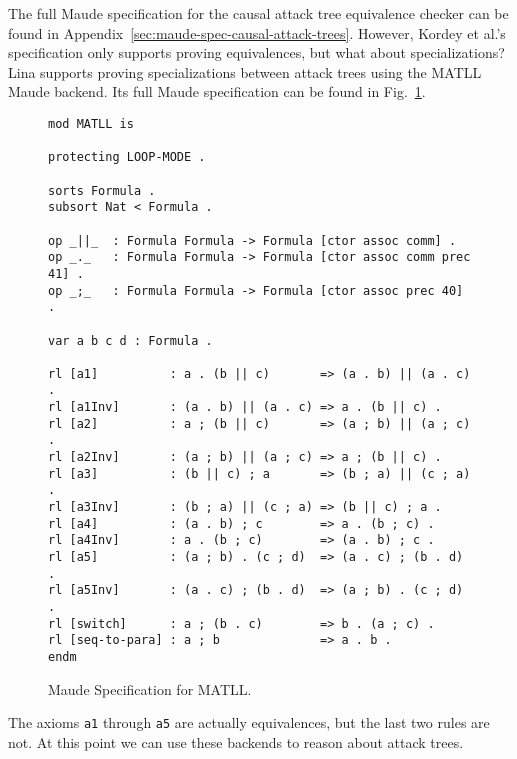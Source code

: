 The full Maude specification for the causal attack tree equivalence
checker can be found in
Appendix~\ref{sec:maude-spec-causal-attack-trees}.  However, Kordey et
al.'s specification only supports proving equivalences, but what about
specializations?  Lina supports proving specializations between attack
trees using the MATLL Maude backend.  Its full Maude specification can
be found in Fig.~\ref{fig:maude-spec-matll}.
\begin{figure}
\begin{mdframed}
\scriptsize
\begin{verbatim}
mod MATLL is

protecting LOOP-MODE .

sorts Formula .
subsort Nat < Formula .

op _||_  : Formula Formula -> Formula [ctor assoc comm] .
op _._   : Formula Formula -> Formula [ctor assoc comm prec 41] .
op _;_   : Formula Formula -> Formula [ctor assoc prec 40] .

var a b c d : Formula .

rl [a1]          : a . (b || c)       => (a . b) || (a . c) .
rl [a1Inv]       : (a . b) || (a . c) => a . (b || c) .
rl [a2]          : a ; (b || c)       => (a ; b) || (a ; c) .
rl [a2Inv]       : (a ; b) || (a ; c) => a ; (b || c) .
rl [a3]          : (b || c) ; a       => (b ; a) || (c ; a) .
rl [a3Inv]       : (b ; a) || (c ; a) => (b || c) ; a .
rl [a4]          : (a . b) ; c        => a . (b ; c) .
rl [a4Inv]       : a . (b ; c)        => (a . b) ; c .
rl [a5]          : (a ; b) . (c ; d)  => (a . c) ; (b . d) .
rl [a5Inv]       : (a . c) ; (b . d)  => (a ; b) . (c ; d) .
rl [switch]      : a ; (b . c)        => b . (a ; c) .
rl [seq-to-para] : a ; b              => a . b .
endm      
\end{verbatim}
\end{mdframed}
  \caption{Maude Specification for MATLL.}
  \label{fig:maude-spec-matll}
\end{figure}
The axioms \verb!a1! through \verb!a5! are actually equivalences, but
the last two rules are not.  At this point we can use these backends
to reason about attack trees.

